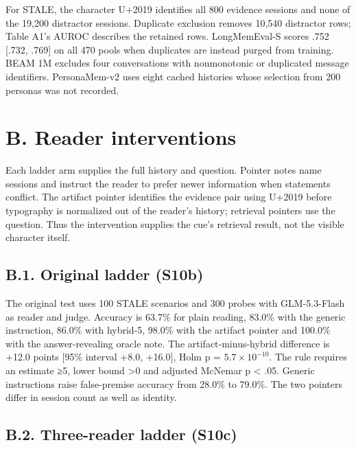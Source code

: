 \documentclass[11pt]{article}
\begin{document}
\endgroup

For STALE, the character U+2019 identifies all 800 evidence sessions and none of the 19,200 distractor sessions. Duplicate exclusion removes 10,540 distractor rows; Table A1's AUROC describes the retained rows. LongMemEval-S scores .752 {[}.732, .769{]} on all 470 pools when duplicates are instead purged from training. BEAM 1M excludes four conversations with nonmonotonic or duplicated message identifiers. Persona\-Mem-v2 uses eight cached histories whose selection from 200 personas was not recorded.

\label{appendix-b}

\section{B. Reader interventions}\label{b.-reader-interventions}

Each ladder arm supplies the full history and question. Pointer notes name sessions and instruct the reader to prefer newer information when statements conflict. The artifact pointer identifies the evidence pair using U+2019 before typography is normalized out of the reader's history; retrieval pointers use the question. Thus the intervention supplies the cue's retrieval result, not the visible character itself.

\subsection{B.1. Original ladder (S10b)}\label{b.1.-original-ladder-s10b}

The original test uses 100 STALE scenarios and 300 probes with GLM-5.3-Flash as reader and judge. Accuracy is 63.7\% for plain reading, 83.0\% with the generic instruction, 86.0\% with hybrid-5, 98.0\% with the artifact pointer and 100.0\% with the answer-revealing oracle note. The artifact-minus-hybrid difference is +12.0 points {[}95\% interval +8.0, +16.0{]}, Holm p = \(5.7 \times 10^{-10}\). The rule requires an estimate ≥5, lower bound \textgreater0 and adjusted McNemar p \textless{} .05. Generic instructions raise false-premise accuracy from 28.0\% to 79.0\%. The two pointers differ in session count as well as identity.

\label{appendix-b2}

\subsection{B.2. Three-reader ladder (S10c)}\label{b.2.-three-reader-ladder-s10c}
\end{document}
